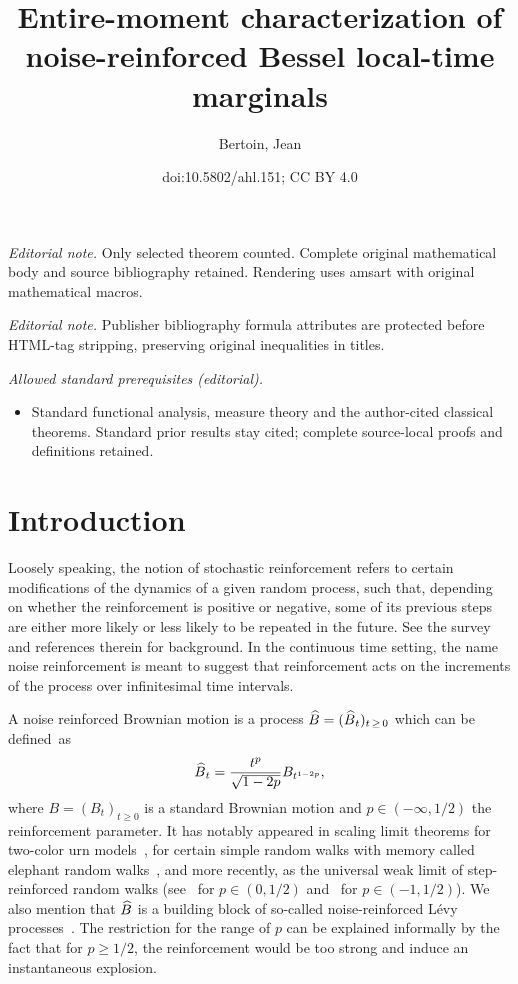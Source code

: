 \documentclass[10pt]{amsart}
\title{Entire-moment characterization of noise-reinforced Bessel local-time marginals}
\author{Bertoin, Jean}
\date{doi:10.5802/ahl.151; CC BY 4.0}
\theoremstyle{definition}\newtheorem{defi}[theo]{Definition}\newtheorem{rema}[theo]{Remark}\newtheorem{exam}[theo]{Example}\newtheorem{exem}[theo]{Example}\newtheorem{nota}[theo]{Notation}
\renewcommand{\hat}[1]{\widehat{#1}}
\let\oldhat\hat
\renewcommand*{\hat}[1]{\mathchoice{\widehat{#1}}{\widehat{#1}}{\oldhat{#1}}{\oldhat{#1}}}
\begin{document}
\maketitle
\noindent\textit{Editorial note.} Only selected theorem counted. Complete original mathematical body and source bibliography retained. Rendering uses amsart with original mathematical macros.\par\medskip
\noindent\textit{Editorial note.} Publisher bibliography formula attributes are protected before HTML-tag stripping, preserving original inequalities in titles.\par\medskip
\noindent\textit{Allowed standard prerequisites (editorial).}\begin{itemize}
\item Standard functional analysis, measure theory and the author-cited classical theorems. Standard prior results stay cited; complete source-local proofs and definitions retained.
\end{itemize}\medskip


\section{Introduction}\label{sec:introduction}
Loosely speaking, the notion of stochastic reinforcement refers to certain modifications of the dynamics of a given random process, such that, depending on whether the reinforcement is positive or negative, some of its previous steps are either more likely or less likely to be repeated in the future. See the survey~\cite{Pem} and references therein for background. In the continuous time setting, the name noise reinforcement is meant to suggest that reinforcement acts on the increments of the process over infinitesimal time intervals.

A noise reinforced Brownian motion is a process $\hat B=(\hat B_t)_{t\,\geq\,0}$ which can be defined~as
\[
\hat B_t = \frac{t^{p}}{\sqrt{1-2p}}{B_{t^{1-2p}}},
\]
where $B=(B_t)_{t\geq 0}$ is a standard Brownian motion and $p\in(-\infty,1/2)$ the reinforcement parameter. It has notably appeared in scaling limit theorems for two-color urn models~\cite{BHZ,Gouet}, for certain simple random walks with memory called elephant random walks~\cite{BaurBer,ColGavSch2}, and more recently, as the universal weak limit of step-reinforced random walks (see~\cite{BerVla} for $p\in(0,1/2)$ and~\cite{BerRos} for $p\in(-1,1/2)$). We also mention that $\hat B$ is a building block of so-called noise-reinforced Lévy processes~\cite{NRLP}. The restriction for the range of $p$ can be explained informally by the fact that for $p\geq 1/2$, the reinforcement would be too strong and induce an instantaneous explosion.
\end{document}
